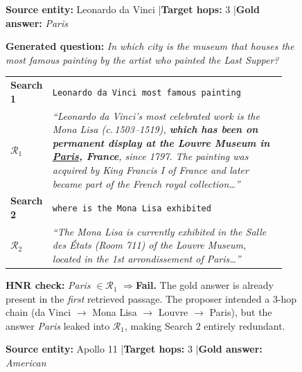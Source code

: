 \documentclass{article}
\begin{document}
\begin{figure}[t]
\begin{tcolorbox}[appbox,title={Hop Necessity Rate: Illustrative Examples},width=\textwidth]
\medskip

\begin{tcolorbox}[failbox,title={HNR Fail \#1: Answer Leaked in First Retrieval (3-hop chain)}]
\small
\textbf{Source entity:} Leonardo da Vinci \quad|\quad \textbf{Target hops:} 3 \quad|\quad \textbf{Gold answer:} \textit{Paris}

\smallskip
\textbf{Generated question:} \emph{In which city is the museum that houses the most famous painting by the artist who painted the Last Supper?}

\medskip
\begin{tabular}{@{}p{0.10\linewidth}p{0.84\linewidth}@{}}
\textbf{Search 1} & \texttt{Leonardo da Vinci most famous painting} \\[1mm]
$\mathcal{R}_1$ &
\begin{minipage}[t]{\linewidth}
\small\itshape
``Leonardo da Vinci's most celebrated work is the \textit{Mona Lisa} (c.\,1503--1519), \textbf{which has been on permanent display at the Louvre Museum in \underline{Paris}, France}, since 1797. The painting was acquired by King Francis I of France and later became part of the French royal collection\ldots''
\end{minipage}\\[3mm]
\textbf{Search 2} & \texttt{where is the Mona Lisa exhibited} \\[1mm]
$\mathcal{R}_2$ &
\begin{minipage}[t]{\linewidth}
\small\itshape
``The Mona Lisa is currently exhibited in the Salle des États (Room 711) of the Louvre Museum, located in the 1st arrondissement of Paris\ldots''
\end{minipage}\\
\end{tabular}

\medskip
\textbf{HNR check:} \emph{Paris} $\in \mathcal{R}_1$ \quad$\Rightarrow$\quad \textcolor{red!70!black}{\textbf{Fail.}}
The gold answer is already present in the \emph{first} retrieved passage. The proposer intended a 3-hop chain (da Vinci $\to$ Mona Lisa $\to$ Louvre $\to$ Paris), but the answer \emph{Paris} leaked into $\mathcal{R}_1$, making Search 2 entirely redundant.
\end{tcolorbox}

\medskip

\begin{tcolorbox}[failbox,title={HNR Fail \#2: Answer Leaked in First Retrieval (3-hop chain)}]
\small
\textbf{Source entity:} Apollo 11 \quad|\quad \textbf{Target hops:} 3 \quad|\quad \textbf{Gold answer:} \textit{American}


\end{tcolorbox}
\end{tcolorbox}
\end{figure}
\end{document}
